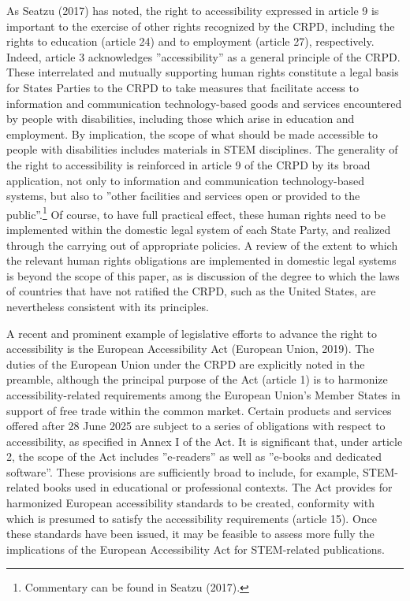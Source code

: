 \documentclass{sig-alternate} %
\begin{document}
\begin{large}
As Seatzu (2017) has noted, the right to accessibility expressed in article 9 is important to the exercise of other rights recognized by the CRPD, including the rights to education (article 24) and to employment (article 27), respectively. Indeed, article 3 acknowledges ”accessibility” as a general principle of the CRPD. These interrelated and mutually supporting human rights constitute a legal basis for States Parties to the CRPD to take measures that facilitate access to information and communication technology-based goods and services encountered by people with disabilities, including those which arise in education and employment. By implication, the scope of what should be made accessible to people with disabilities includes materials in STEM disciplines. The generality of the right to accessibility is reinforced in article 9 of the CRPD by its broad application, not only to information and communication technology-based systems, but also to ”other facilities and services open or provided to the public”.\footnote{Commentary can be found in Seatzu (2017).} Of course, to have full practical effect, these human rights need to be implemented within the domestic legal system of each State Party, and realized through the carrying out of appropriate policies. A review of the extent to which the relevant human rights obligations are implemented in domestic legal systems is beyond the scope of this paper, as is discussion of the degree to which the laws of countries that have not ratified the CRPD, such as the United States, are nevertheless consistent with its principles.

A recent and prominent example of legislative efforts to advance the right to accessibility is the European Accessibility Act (European Union, 2019). The duties of the European Union under the CRPD are explicitly noted in the preamble, although the principal purpose of the Act (article 1) is to harmonize accessibility-related requirements among the European Union’s Member States in support of free trade within the common market. Certain products and services offered after 28 June 2025 are subject to a series of obligations with respect to accessibility, as specified in Annex I of the Act. It is significant that, under article 2, the scope of the Act includes ”e-readers” as well as ”e-books and dedicated software”. These provisions are sufficiently broad to include, for example, STEM-related books used in educational or professional contexts. The Act provides for harmonized European accessibility standards to be created, conformity with which is presumed to satisfy the accessibility requirements (article 15). Once these standards have been issued, it may be feasible to assess more fully the implications of the European Accessibility Act for STEM-related publications.


\end{large}
\end{document}
